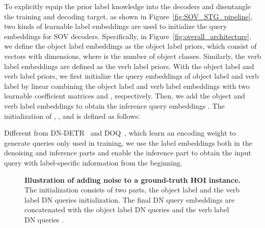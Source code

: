 \documentclass[10pt,twocolumn,letterpaper]{article}
\begin{document}
\label{sec:split_label_embedding}
\quad To explicitly equip the prior label knowledge into the decoders and disentangle the training and decoding target,
as shown in Figure~\ref{fig:SOV_STG_pipeline}, two kinds of learnable label embeddings are used to initialize the query embeddings for SOV decoders.
Specifically, in Figure~\ref{fig:overall_architecture}, we define the object label embeddings  as the object label priors, which consist of  vectors with  dimensions, where  is the number of object classes.
Similarly, the verb label embeddings  are defined as the verb label priors.
With the object label and verb label priors, we first initialize the query embeddings of object label  and verb label  by linear combining the object label and verb label embeddings with two learnable coefficient matrices  and , respectively.
Then, we add the object and verb label embeddings to obtain the inference query embeddings .
The initialization of , , and  is defined as follows:


Different from DN-DETR~\cite{Li_2022_CVPR} and DOQ~\cite{qu2022distillation}, which learn an encoding weight to generate queries only used in training,
we use the label embeddings both in the denoising and inference parts and enable the inference part to obtain the input query with label-specific information from the beginning.

\begin{figure}[!t]
  \centering
  \caption{
      \textbf{Illustration of adding noise to a ground-truth HOI instance.}
      The initialization consists of two parts, the object label and the verb label DN queries initialization.
      The final DN query embeddings  are concatenated with the object label DN queries  and the verb label DN queries .
}
\label{fig:dn_query_init}
\end{figure}
\end{document}
